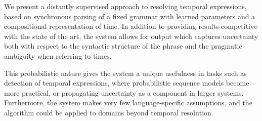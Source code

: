 We present a distantly supervised approach to resolving temporal expressions,
	based on synchronous parsing of a fixed grammar with learned parameters
	and a compositional representation of time.
In addition to providing results competitive with the state of the art,
	the system allows for output which captures uncertainty both with respect to 
	the syntactic structure of the phrase and the pragmatic ambiguity when 
	referring to times.

This probabilistic nature gives the system a unique usefulness
	in tasks such as detection of temporal expressions, where probabilistic
	sequence models become more practical, or propagating uncertainty as a
	component in larger systems.
Furthermore, the system makes very few language-specific assumptions,
	and the algorithm could be applied to domains beyond temporal resolution.
